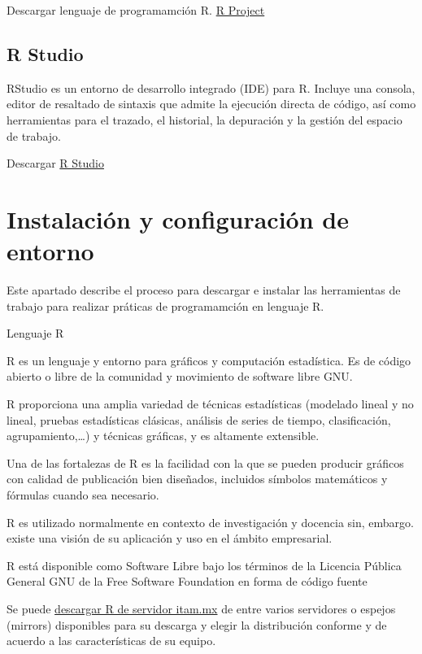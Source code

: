 \documentclass[
]{book}
\begin{document}
Descargar lenguaje de programamción R. \href{https://www.r-project.org/}{R Project}

\hypertarget{r-studio}{%
\section{R Studio}\label{r-studio}}

RStudio es un entorno de desarrollo integrado (IDE) para R. Incluye una consola, editor de resaltado de sintaxis que admite la ejecución directa de código, así como herramientas para el trazado, el historial, la depuración y la gestión del espacio de trabajo.

Descargar \href{https://rstudio.com/products/rstudio/}{R Studio}

\hypertarget{instalaciuxf3n-y-configuraciuxf3n-de-entorno}{%
\chapter{Instalación y configuración de entorno}\label{instalaciuxf3n-y-configuraciuxf3n-de-entorno}}

Este apartado describe el proceso para descargar e instalar las herramientas de trabajo para realizar práticas de programamción en lenguaje R.

Lenguaje R

R es un lenguaje y entorno para gráficos y computación estadística. Es de código abierto o libre de la comunidad y movimiento de software libre GNU.

R proporciona una amplia variedad de técnicas estadísticas (modelado lineal y no lineal, pruebas estadísticas clásicas, análisis de series de tiempo, clasificación, agrupamiento,\ldots) y técnicas gráficas, y es altamente extensible.

Una de las fortalezas de R es la facilidad con la que se pueden producir gráficos con calidad de publicación bien diseñados, incluidos símbolos matemáticos y fórmulas cuando sea necesario.

R es utilizado normalmente en contexto de investigación y docencia sin, embargo. existe una visión de su aplicación y uso en el ámbito empresarial.

R está disponible como Software Libre bajo los términos de la Licencia Pública General GNU de la Free Software Foundation en forma de código fuente \citep{r.fundation2021a}

Se puede \href{https://cran.itam.mx/}{descargar R de servidor itam.mx} de entre varios servidores o espejos (mirrors) disponibles para su descarga y elegir la distribución conforme y de acuerdo a las características de su equipo.
\end{document}
